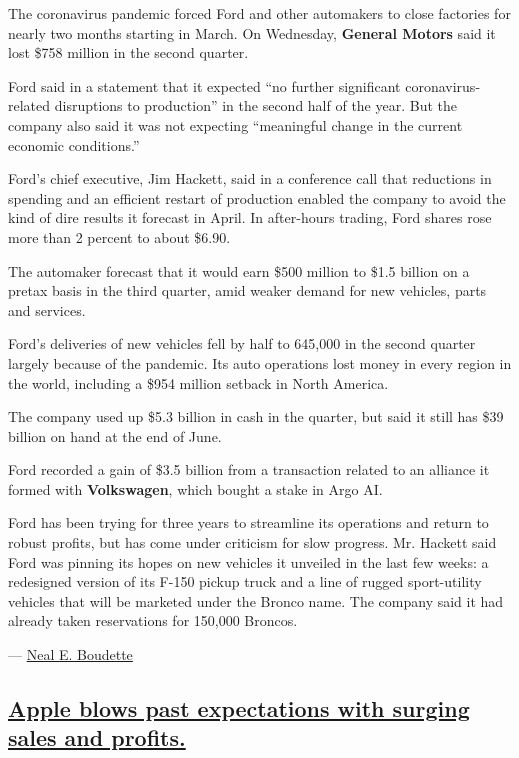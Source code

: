 The coronavirus pandemic forced Ford and other automakers to close
factories for nearly two months starting in March. On Wednesday,
\textbf{General Motors} said it lost \$758 million in the second
quarter.

Ford said in a statement that it expected ``no further significant
coronavirus-related disruptions to production'' in the second half of
the year. But the company also said it was not expecting ``meaningful
change in the current economic conditions.''

Ford's chief executive, Jim Hackett, said in a conference call that
reductions in spending and an efficient restart of production enabled
the company to avoid the kind of dire results it forecast in April. In
after-hours trading, Ford shares rose more than 2 percent to about
\$6.90.

The automaker forecast that it would earn \$500 million to \$1.5 billion
on a pretax basis in the third quarter, amid weaker demand for new
vehicles, parts and services.

Ford's deliveries of new vehicles fell by half to 645,000 in the second
quarter largely because of the pandemic. Its auto operations lost money
in every region in the world, including a \$954 million setback in North
America.

The company used up \$5.3 billion in cash in the quarter, but said it
still has \$39 billion on hand at the end of June.

Ford recorded a gain of \$3.5 billion from a transaction related to an
alliance it formed with \textbf{Volkswagen}, which bought a stake in
Argo AI.

Ford has been trying for three years to streamline its operations and
return to robust profits, but has come under criticism for slow
progress. Mr. Hackett said Ford was pinning its hopes on new vehicles it
unveiled in the last few weeks: a redesigned version of its F-150 pickup
truck and a line of rugged sport-utility vehicles that will be marketed
under the Bronco name. The company said it had already taken
reservations for 150,000 Broncos.

--- \href{https://www.nytimes3xbfgragh.onion/by/neal-e-boudette}{Neal E.
Boudette}

\hypertarget{apple-blows-past-expectations-with-surging-sales-and-profits}{%
\subsection{\texorpdfstring{\protect\hyperlink{apple-blows-past-expectations-with-surging-sales-and-profits}{Apple
blows past expectations with surging sales and
profits.}}{Apple blows past expectations with surging sales and profits.}}\label{apple-blows-past-expectations-with-surging-sales-and-profits}}

